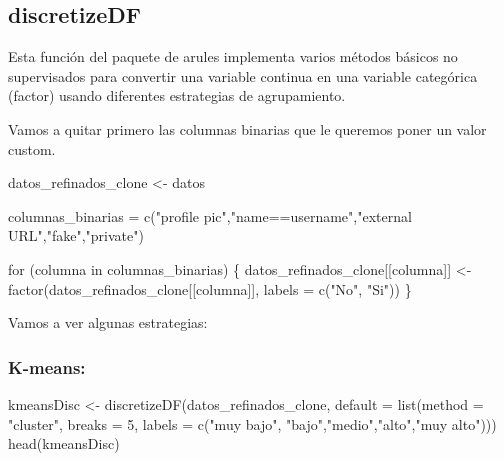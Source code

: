 \documentclass[
  letterpaper,
  DIV=11,
  numbers=noendperiod]{scrreprt}
\newenvironment{Shaded}{\begin{snugshade}}{\end{snugshade}}
\newcommand{\AttributeTok}[1]{\textcolor[rgb]{0.40,0.45,0.13}{#1}}
\newcommand{\ControlFlowTok}[1]{\textcolor[rgb]{0.00,0.23,0.31}{#1}}
\newcommand{\DecValTok}[1]{\textcolor[rgb]{0.68,0.00,0.00}{#1}}
\newcommand{\FunctionTok}[1]{\textcolor[rgb]{0.28,0.35,0.67}{#1}}
\newcommand{\NormalTok}[1]{\textcolor[rgb]{0.00,0.23,0.31}{#1}}
\newcommand{\OtherTok}[1]{\textcolor[rgb]{0.00,0.23,0.31}{#1}}
\newcommand{\StringTok}[1]{\textcolor[rgb]{0.13,0.47,0.30}{#1}}
\begin{document}
\subsection{discretizeDF}\label{discretizedf}

Esta función del paquete de arules implementa varios métodos básicos no
supervisados para convertir una variable continua en una variable
categórica (factor) usando diferentes estrategias de agrupamiento.

Vamos a quitar primero las columnas binarias que le queremos poner un
valor custom.

\begin{Shaded}
\begin{Highlighting}[]
\NormalTok{datos\_refinados\_clone }\OtherTok{\textless{}{-}}\NormalTok{ datos}

\NormalTok{columnas\_binarias }\OtherTok{=} \FunctionTok{c}\NormalTok{(}\StringTok{"profile pic"}\NormalTok{,}\StringTok{"name==username"}\NormalTok{,}\StringTok{"external URL"}\NormalTok{,}\StringTok{"fake"}\NormalTok{,}\StringTok{"private"}\NormalTok{)}

\ControlFlowTok{for}\NormalTok{ (columna }\ControlFlowTok{in}\NormalTok{ columnas\_binarias) \{}
\NormalTok{  datos\_refinados\_clone[[columna]] }\OtherTok{\textless{}{-}}  \FunctionTok{factor}\NormalTok{(datos\_refinados\_clone[[columna]], }\AttributeTok{labels =} \FunctionTok{c}\NormalTok{(}\StringTok{"No"}\NormalTok{, }\StringTok{"Si"}\NormalTok{))}
\NormalTok{\}}
\end{Highlighting}
\end{Shaded}

Vamos a ver algunas estrategias:

\subsubsection{K-means:}\label{k-means}

\begin{Shaded}
\begin{Highlighting}[]
\NormalTok{kmeansDisc }\OtherTok{\textless{}{-}} \FunctionTok{discretizeDF}\NormalTok{(datos\_refinados\_clone, }\AttributeTok{default =} \FunctionTok{list}\NormalTok{(}\AttributeTok{method =} \StringTok{"cluster"}\NormalTok{, }\AttributeTok{breaks =} \DecValTok{5}\NormalTok{, }
  \AttributeTok{labels =} \FunctionTok{c}\NormalTok{(}\StringTok{"muy bajo"}\NormalTok{, }\StringTok{"bajo"}\NormalTok{,}\StringTok{"medio"}\NormalTok{,}\StringTok{"alto"}\NormalTok{,}\StringTok{"muy alto"}\NormalTok{)))}
\FunctionTok{head}\NormalTok{(kmeansDisc)}
\end{Highlighting}
\end{Shaded}
\end{document}
